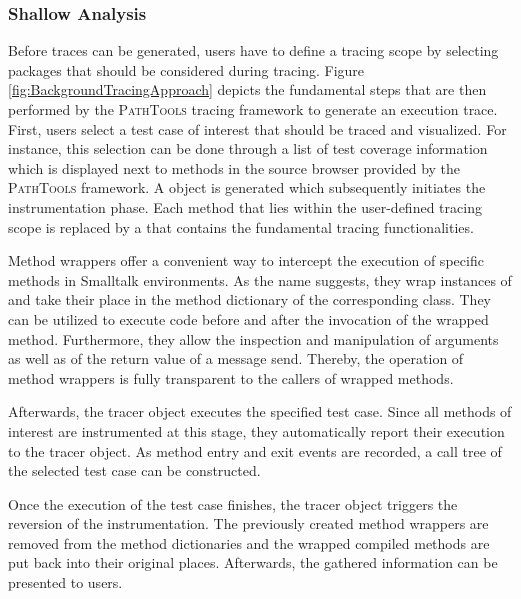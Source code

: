 \subsubsection{Shallow Analysis}
Before traces can be generated, users have to define a tracing scope by selecting  packages that should be considered during tracing.
Figure \ref{fig:BackgroundTracingApproach} depicts the fundamental steps that are then performed by the \textsc{PathTools} tracing framework to generate an execution trace.
First, users select a test case of interest that should be traced and visualized.
For instance, this selection can be done through a list of test coverage information which is displayed next to methods in the source browser provided by the \textsc{PathTools} framework.
A  object is generated which subsequently initiates the instrumentation phase.
Each method that lies within the user-defined tracing scope is replaced by a  that contains the fundamental tracing functionalities.

Method wrappers \cite{brant_wrappers_1998} offer a convenient way to intercept the execution of specific methods in Smalltalk environments.
As the name suggests, they wrap instances of  and take their place in the method dictionary of the corresponding class.
They can be utilized to execute code before and after the invocation of the wrapped method.
Furthermore, they allow the inspection and manipulation of arguments as well as of the return value of a message send.
Thereby, the operation of method wrappers is fully transparent to the callers of wrapped methods.

Afterwards, the tracer object executes the specified test case.
Since all methods of interest are instrumented at this stage, they automatically report their execution to the tracer object.
As method entry and exit events are recorded, a call tree of the selected test case can be constructed.

Once the execution of the test case finishes, the tracer object triggers the reversion of the instrumentation.
The previously created method wrappers are removed from the method dictionaries and the wrapped compiled methods are put back into their original places.
Afterwards, the gathered information can be presented to users.

